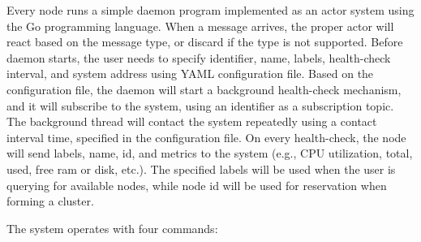 Every node runs a simple daemon program implemented as an actor system using the Go programming language. When a message arrives, the proper actor will react based on the message type, or discard if the type is not supported. Before daemon starts, the user needs to specify identifier, name, labels, health-check interval, and system address using YAML configuration file. Based on the configuration file, the daemon will start a background health-check mechanism, and it will subscribe to the system, using an identifier as a subscription topic. The background thread will contact the system repeatedly using a contact interval time, specified in the configuration file. On every health-check, the node will send labels, name, id, and metrics to the system (e.g., CPU utilization, total, used, free ram or disk, etc.). The specified labels will be used when the user is querying for available nodes, while node id will be used for reservation when forming a cluster.

The system operates with four commands: 

